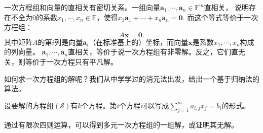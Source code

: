 \documentclass[12pt,UTF8]{ctexbook}
\begin{document}
一次方程组和向量的直相关有密切关系。一组向量$\mathbf{a}_1, \cdots , \mathbf{a}_n \in \mathbb{F}^m$直相关，
说明存在不全为$0$的系数$x_1, \cdots , x_n \in \mathbb{F}$，使得$x_1\mathbf{a}_1 + \cdots + x_n\mathbf{a}_n = \mathbf{0}.$
而这个等式等价于一次方程组：
$$ A\mathbf{x} = \mathbf{0}.$$
其中矩阵$A$的第$i$列是向量$\mathbf{a}_i$（在标准基上的）坐标，而向量$\mathbf{x}$是系数$x_1, \cdots , x_n$构成的列向量。
$\mathbf{a}_1, \cdots , \mathbf{a}_n$直相关，等价于说一次方程组有非零解。反之，它们直无关，则等价于一次方程只有平凡解。

如何求一次方程组的解呢？我们从中学学过的消元法出发，给出一个基于归纳法的算法。

设要解的方程组$(\mathcal{S})$有$k$个方程。第$i$个方程可以写成$\sum_{j=1}^m a_{i,j} x_j = b_{i}$的形式。


\begin{pp}\label{pp:5_0_0}
通过有限次四则运算，可以得到多元一次方程组的一组解，或证明其无解。
\end{pp}
\end{document}
